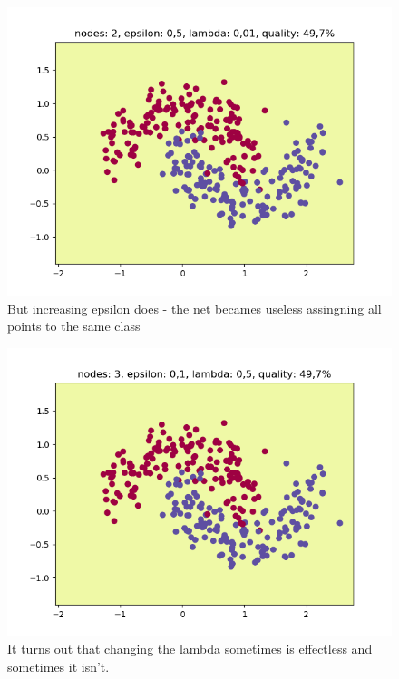 \documentclass[3p,twocolumn]{elsarticle}
\begin{document}
\begin{figure}[h!]
\label{fig:fig4}
  \includegraphics[width=\linewidth]{wykresy/5.png}
	\caption{But increasing epsilon does - the net becames useless assingning all points to the same class}
	\label{fig4}
\end{figure}

\begin{figure}[h!]
\label{fig:fig4}
  \includegraphics[width=\linewidth]{wykresy/10.png}
	\caption{It turns out that changing the lambda sometimes is effectless and sometimes it isn't.}
	\label{fig4}
\end{figure}
\end{document}
